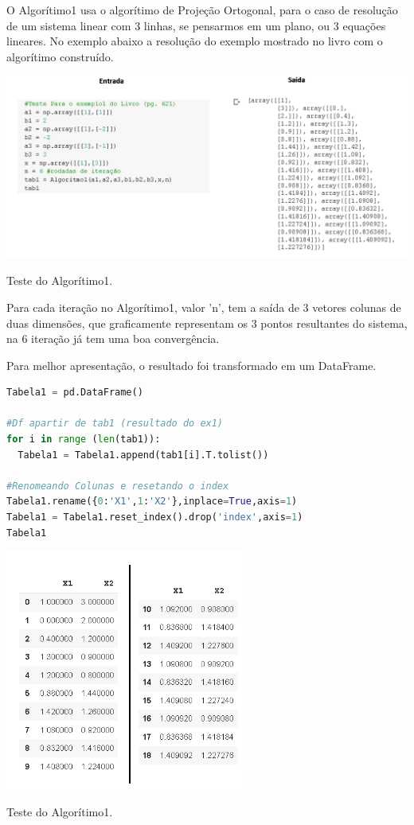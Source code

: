 \documentclass[a4paper, 12pt]{article}
\begin{document}
O Algorítimo1 usa o algorítimo de Projeção Ortogonal, para o caso de resolução de um sistema linear com 3 linhas, se pensarmos em um plano, ou 3 equações lineares. No exemplo abaixo a resolução do exemplo mostrado no livro com o algorítimo construído.

\begin{center}
    \includegraphics[width=16cm]{09_Teste_Algoritimo1.PNG}
    
    Teste do Algorítimo1.
\end{center}
 
Para cada iteração no Algorítimo1, valor 'n', tem a saída de 3 vetores colunas de duas dimensões, que graficamente representam os 3 pontos resultantes do sistema, na 6 iteração já tem uma boa convergência.

Para melhor apresentação, o resultado foi transformado em um DataFrame.

\begin{lstlisting}[language=Python, caption=Tabela 1 em DataFrame, label=listing_Tab1toDF] 
Tabela1 = pd.DataFrame()

#Df apartir de tab1 (resultado do ex1)
for i in range (len(tab1)):
  Tabela1 = Tabela1.append(tab1[i].T.tolist())

#Renomeando Colunas e resetando o index
Tabela1.rename({0:'X1',1:'X2'},inplace=True,axis=1)
Tabela1 = Tabela1.reset_index().drop('index',axis=1)
Tabela1
\end{lstlisting}

\begin{center}
    \includegraphics[width=8cm]{10_Exemplo1_DF.PNG}
    
    Teste do Algorítimo1.
\end{center}
\end{document}
